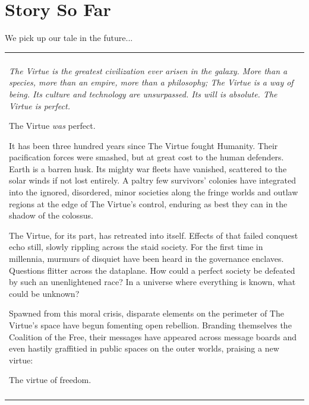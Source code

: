\makeatletter\@openrightfalse
\chapter{Story So Far}
\@openrighttrue\makeatother

We pick up our tale in the future...

\bigskip
\begin{center}  
\begin{tabular}{L{6in}}
  \hline\\
  {\it
  The Virtue is the greatest civilization ever arisen in the galaxy.
  More than a species, more than an empire, more than a philosophy; The
  Virtue is a way of being.  Its culture and technology
  are unsurpassed.  Its will is absolute.  The Virtue is perfect.

  \bigskip
  The Virtue \emph{was} perfect.

  \bigskip
  It has been three hundred years since The Virtue fought Humanity.  Their
  pacification forces were smashed, but at great cost to the human
  defenders.  Earth is a barren husk.  Its mighty war fleets have
  vanished, scattered to the solar winds if not lost entirely.  A paltry
  few survivors' colonies have integrated into the ignored, disordered,
  minor societies along the fringe worlds and outlaw regions at the edge
  of The Virtue's control, enduring as best they can in the shadow of the
  colossus.

  \smallskip
  The Virtue, for its part, has retreated into itself.  Effects of that
  failed conquest echo still, slowly rippling across the staid society.
  For the first time in millennia, murmurs of disquiet have been heard
  in the governance enclaves.  Questions flitter across the dataplane.
  How could a perfect society be defeated by such an unenlightened race?
  In a universe where everything is known, what could be unknown?

  \smallskip
  Spawned from this moral crisis, disparate elements on the perimeter of
  The Virtue's space have begun fomenting open rebellion.  Branding themselves
  the Coalition of the Free, their messages have appeared across
  message boards and even hastily graffitied in public spaces on the
  outer worlds, praising a new virtue:

  \bigskip
  \centerline{The virtue of freedom.}
  }
  \\
  \hline\\
\end{tabular}
\end{center}

